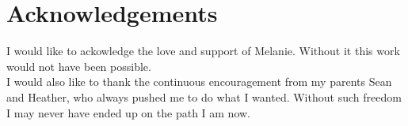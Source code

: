 \chapter{Acknowledgements}

I would like to ackowledge the love and support of Melanie. Without it this work would not have been possible.\\ 

I would also like to thank the continuous encouragement from my parents Sean and Heather, who always pushed me to do what I wanted. Without such freedom I may never have ended up on the path I am now.
